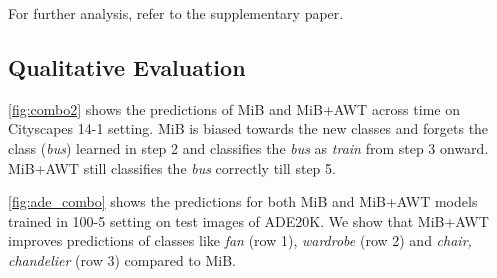 For further analysis, refer to the supplementary paper.

\subsection{Qualitative Evaluation}
\cref{fig:combo2} shows the predictions of MiB and MiB+AWT across time on Cityscapes 14-1 setting. MiB is biased towards the new classes and forgets the class (\emph{bus}) learned in step 2 and classifies the \emph{bus} as \emph{train} from step 3 onward. MiB+AWT still classifies the \emph{bus} correctly till step 5.

\cref{fig:ade_combo} shows the predictions for both MiB and MiB+AWT models trained in 100-5 setting on test images of ADE20K. We show that MiB+AWT improves predictions of classes like \emph{fan} (row 1), \emph{wardrobe} (row 2) and \emph{chair, chandelier} (row 3) compared to MiB.

\adecombo{}